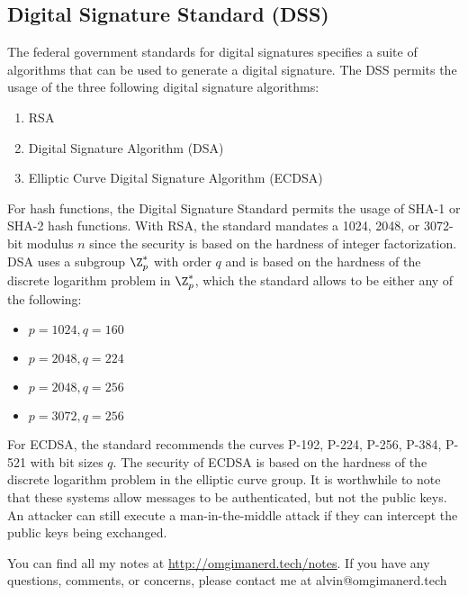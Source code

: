 \documentclass{math}
\begin{document}
\subsection*{Digital Signature Standard (DSS)}
The federal government standards for digital signatures specifies a suite of
algorithms that can be used to generate a digital signature. The DSS permits
the usage of the three following digital signature algorithms:
\begin{enumerate}
  \item RSA
  \item Digital Signature Algorithm (DSA)
  \item Elliptic Curve Digital Signature Algorithm (ECDSA)
\end{enumerate}
For hash functions, the Digital Signature Standard permits the usage of SHA-1
or SHA-2 hash functions. With RSA, the standard mandates a 1024, 2048, or
3072-bit modulus \( n \) since the security is based on the hardness of integer
factorization. DSA uses a subgroup \( \Z_p^* \) with order \( q \) and is based
on the hardness of the discrete logarithm problem in \( \Z_p^* \), which
the standard allows to be either any of the following:
\begin{itemize}
  \item \( p = 1024, q = 160 \)
  \item \( p = 2048, q = 224 \)
  \item \( p = 2048, q = 256 \)
  \item \( p = 3072, q = 256 \)
\end{itemize}
For ECDSA, the standard recommends the curves P-192, P-224, P-256, P-384, P-521
with bit sizes \( q \). The security of ECDSA is based on the hardness of the
discrete logarithm problem in the elliptic curve group. It is worthwhile to note
that these systems allow messages to be authenticated, but not the public keys.
An attacker can still execute a man-in-the-middle attack if they can intercept
the public keys being exchanged.

\begin{center}
  You can find all my notes at \url{http://omgimanerd.tech/notes}. If you have
  any questions, comments, or concerns, please contact me at
  alvin@omgimanerd.tech
\end{center}
\end{document}
